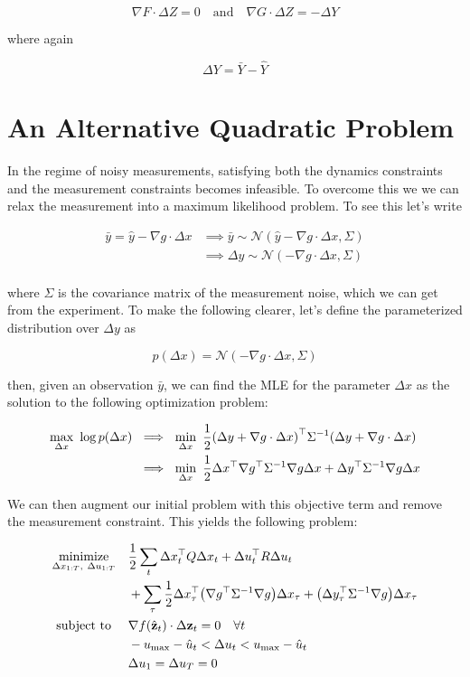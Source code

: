 \documentclass{article}
\begin{document}
$$
\nabla F \cdot \Delta Z = 0
\quad \text{and} \quad
\nabla G \cdot \Delta Z = - \Delta Y
$$

where again

$$
\Delta Y = \bar Y - \hat Y
$$

\newpage

\section*{An Alternative Quadratic Problem}

In the regime of noisy measurements, satisfying both the dynamics constraints and the measurement constraints becomes infeasible. To overcome this we we can relax the measurement into a maximum likelihood problem.  To see this let's write

\begin{align*}
\bar y = \hat y - \nabla g \cdot \Delta x &\implies \bar y \sim \mathcal{N}(\hat y - \nabla g \cdot \Delta x, \Sigma) \\ 
&\implies \Delta y \sim \mathcal{N}(-\nabla g \cdot \Delta x, \Sigma) \\
\end{align*}

where $\Sigma$ is the covariance matrix of the measurement noise, which we can get from the experiment.  To make the following clearer, let's define the parameterized distribution over $\Delta y$ as

$$
p(\Delta x) = \mathcal{N}(-\nabla g \cdot \Delta x, \Sigma)
$$

then, given an observation $\bar y$, we can find the MLE for the parameter $\Delta x$ as the solution to the following optimization problem:

\begin{align*}
\max_{\Delta x} \ \log p(\Delta x) \ &\implies \ \min_{\Delta x} \ \frac{1}{2} \qty(\Delta y + \nabla g \cdot \Delta x)^\top \Sigma^{-1} \qty(\Delta y + \nabla g \cdot \Delta x) \\
&\implies \ \min_{\Delta x} \ \frac{1}{2} \Delta x^\top \nabla g^\top \Sigma^{-1} \nabla g \Delta x + \Delta y^\top \Sigma^{-1} \nabla g \Delta x 
\end{align*}

We can then augment our initial problem with this objective term and remove the measurement constraint.  This yields the following problem:

\begin{align*}
  \underset{\Delta x_{1:T},\ \Delta u_{1:T}}{\text{minimize}} & \quad \frac{1}{2} \sum_t \Delta x^\top_t Q \Delta x_t + \Delta u^\top_t R \Delta u_t \\
  & \quad + \sum_\tau \frac{1}{2} \Delta x_\tau^\top \qty(\nabla g^\top \Sigma^{-1} \nabla g) \Delta x_\tau + \qty(\Delta y_\tau^\top \Sigma^{-1} \nabla g) \Delta x_\tau \\
  \text{subject to} \ 
  & \quad \nabla f(\hat{\vb{z}}_t) \cdot \Delta {\vb{z}}_t = 0 \quad \forall t \\
  & \quad -u_\text{max} - \hat u_t < \Delta u_t < u_\text{max} - \hat u_t \\
  & \quad \Delta u_1 = \Delta u_T = 0
\end{align*}
\end{document}
